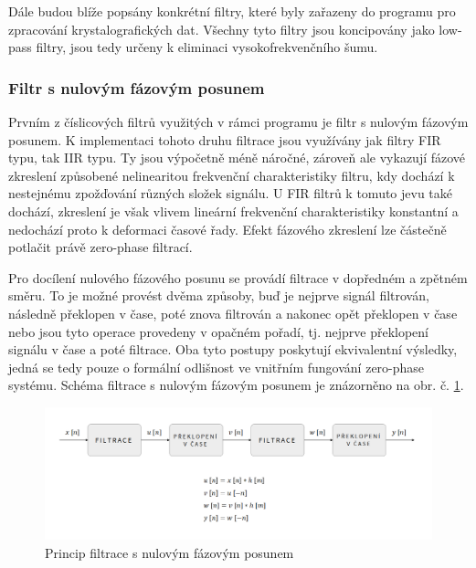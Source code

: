\documentclass[a4paper, 12pt]{article}
\begin{document}
Dále budou blíže popsány konkrétní filtry, které byly zařazeny do programu pro zpracování krystalografických dat. Všechny tyto filtry jsou koncipovány jako low-pass filtry, jsou tedy určeny k eliminaci vysokofrekvenčního šumu.

\subsubsection{Filtr s nulovým fázovým posunem}
\label{sec:filtr1}
Prvním z číslicových filtrů využitých v rámci programu je filtr s nulovým fázovým posunem. K implementaci tohoto druhu filtrace jsou využívány jak filtry FIR typu, tak IIR typu. Ty jsou výpočetně méně náročné, zároveň ale vykazují fázové zkreslení způsobené nelinearitou frekvenční charakteristiky filtru, kdy dochází k nestejnému zpožďování různých složek signálu. U FIR filtrů k tomuto jevu také dochází, zkreslení je však vlivem lineární frekvenční charakteristiky konstantní a nedochází proto k deformaci časové řady. Efekt fázového zkreslení lze částečně potlačit právě zero-phase filtrací. 

Pro docílení nulového fázového posunu se provádí filtrace v dopředném a zpětném směru. To je možné provést dvěma způsoby, buď je nejprve signál filtrován, následně překlopen v čase, poté znova filtrován a nakonec opět překlopen v čase nebo jsou tyto operace provedeny v opačném pořadí, tj. nejprve překlopení signálu v čase a poté filtrace. Oba tyto postupy poskytují ekvivalentní výsledky, jedná se tedy pouze o formální odlišnost ve vnitřním fungování zero-phase systému. Schéma filtrace s nulovým fázovým posunem je znázorněno na obr. č. \ref{fig:zerophase}.
\begin{figure}[hbt!]
  \centering
  \includegraphics[width=\linewidth]{zero-phase_moje.png}
  \caption{Princip filtrace s nulovým fázovým posunem}
  \label{fig:zerophase}
\end{figure}
\end{document}
